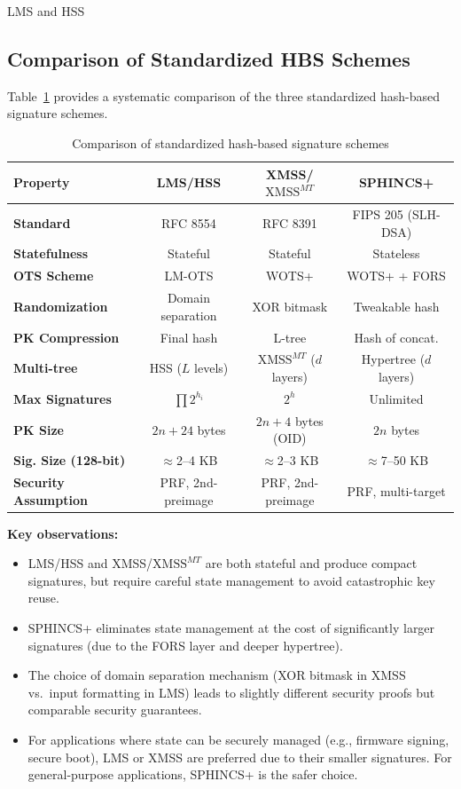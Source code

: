 \documentclass[version=preprint]{iacrcc}
\begin{document}
\begin{section}{LMS and HSS}
\subsection{Comparison of Standardized HBS Schemes}

Table~\ref{tab:hbs_comparison} provides a systematic comparison of the three standardized hash-based signature schemes.

\begin{table}[ht]
\centering
\renewcommand{\arraystretch}{1.3}
\caption{Comparison of standardized hash-based signature schemes}
\label{tab:hbs_comparison}
\begin{tabular}{|l|c|c|c|}
\hline
\textbf{Property} & \textbf{LMS/HSS} & \textbf{XMSS/$\text{XMSS}^{MT}$} & \textbf{SPHINCS+} \\
\hline
\textbf{Standard} & RFC 8554 & RFC 8391 & FIPS 205 (SLH-DSA) \\
\hline
\textbf{Statefulness} & Stateful & Stateful & Stateless \\
\hline
\textbf{OTS Scheme} & LM-OTS & WOTS+ & WOTS+ + FORS \\
\hline
\textbf{Randomization} & Domain separation & XOR bitmask & Tweakable hash \\
\hline
\textbf{PK Compression} & Final hash & L-tree & Hash of concat. \\
\hline
\textbf{Multi-tree} & HSS ($L$ levels) & $\text{XMSS}^{MT}$ ($d$ layers) & Hypertree ($d$ layers) \\
\hline
\textbf{Max Signatures} & $\prod 2^{h_i}$ & $2^h$ & Unlimited \\
\hline
\textbf{PK Size} & $2n + 24$ bytes & $2n + 4$ bytes (OID) & $2n$ bytes \\
\hline
\textbf{Sig. Size (128-bit)} & $\approx$2--4 KB & $\approx$2--3 KB & $\approx$7--50 KB \\
\hline
\textbf{Security Assumption} & PRF, 2nd-preimage & PRF, 2nd-preimage & PRF, multi-target \\
\hline
\end{tabular}
\end{table}

\textbf{Key observations:}
\begin{itemize}
    \item LMS/HSS and XMSS/$\text{XMSS}^{MT}$ are both stateful and produce compact signatures, but require careful state management to avoid catastrophic key reuse.
    \item SPHINCS+ eliminates state management at the cost of significantly larger signatures (due to the FORS layer and deeper hypertree).
    \item The choice of domain separation mechanism (XOR bitmask in XMSS vs.\ input formatting in LMS) leads to slightly different security proofs but comparable security guarantees.
    \item For applications where state can be securely managed (e.g., firmware signing, secure boot), LMS or XMSS are preferred due to their smaller signatures. For general-purpose applications, SPHINCS+ is the safer choice.
\end{itemize}

\end{section}
\end{document}
